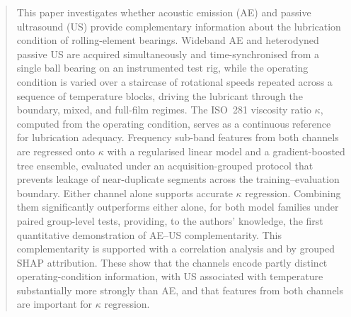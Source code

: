 \begin{abstract}
This paper investigates whether acoustic emission (AE) and passive ultrasound (US) provide complementary information about the lubrication condition of rolling-element bearings. Wideband AE and heterodyned passive US are acquired simultaneously and time-synchronised from a single ball bearing on an instrumented test rig, while the operating condition is varied over a staircase of rotational speeds repeated across a sequence of temperature blocks, driving the lubricant through the boundary, mixed, and full-film regimes. The ISO~281 viscosity ratio $\kappa$, computed from the operating condition, serves as a continuous reference for lubrication adequacy. Frequency sub-band features from both channels are regressed onto $\kappa$ with a regularised linear model and a gradient-boosted tree ensemble, evaluated under an acquisition-grouped protocol that prevents leakage of near-duplicate segments across the training--evaluation boundary. Either channel alone supports accurate $\kappa$ regression. Combining them significantly outperforms either alone, for both model families under paired group-level tests, providing, to the authors' knowledge, the first quantitative demonstration of AE--US complementarity. This complementarity is supported with a correlation analysis and by grouped SHAP attribution. These show that the channels encode partly distinct operating-condition information, with US associated with temperature substantially more strongly than AE, and that features from both channels are important for $\kappa$ regression.
\end{abstract}
